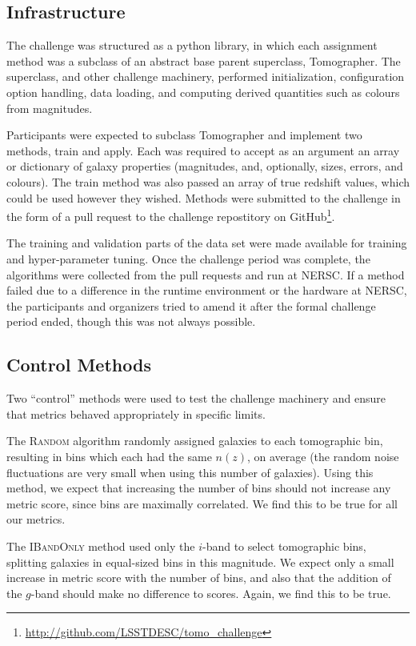 \documentclass[twocolumn,twocolappendix]{aastex63}
\begin{document}
\subsection{Infrastructure}

The challenge was structured as a python library, in which each assignment
method was a subclass of an abstract base parent superclass, {\sc Tomographer}.
The superclass, and other challenge machinery, performed initialization,
configuration option handling, data loading, and computing derived quantities
such as colours from magnitudes.

Participants were expected to subclass
{\sc Tomographer} and implement two methods, {\sc train} and {\sc apply}.  Each
was required to accept as an argument an array or dictionary of galaxy properties
(magnitudes, and, optionally, sizes, errors, and colours).  The {\sc train} method
was also passed an array of true redshift values, which could be used however they wished.
Methods were submitted to the challenge in the form of a pull request to the challenge
repostitory on GitHub\footnote{\url{http://github.com/LSSTDESC/tomo_challenge}}.

The training and validation parts of the data set were made available for training
and hyper-parameter tuning. Once the challenge period was complete, the algorithms
were collected from the pull requests and run at NERSC. If a method failed due to a difference in the
runtime environment or the hardware at NERSC, the participants and organizers tried
to amend it after the formal challenge period ended, though this was not always possible.



\subsection{Control Methods}

Two ``control'' methods were used to test the challenge machinery and ensure
that metrics behaved appropriately in specific limits.

The \textsc{Random} algorithm randomly assigned galaxies to each tomographic bin, resulting
in bins which each had the same $n(z)$, on average (the random noise fluctuations
are very small when using this number of galaxies).  Using this method, we expect
that increasing the number of bins should not increase any metric score, since bins are
maximally correlated.  We find this to be true for all our metrics.

The \textsc{IBandOnly} method used only the $i$-band to select tomographic bins,
splitting galaxies in equal-sized bins in this magnitude. We expect only a small
increase in metric score with the number of bins, and also that the addition of the $g$-band
should make no difference to scores.  Again, we find this to be true.
\end{document}
